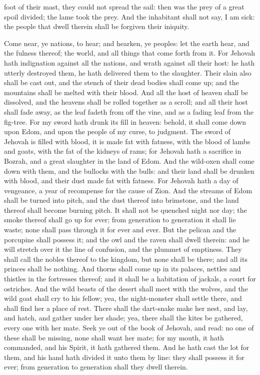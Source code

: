 foot of their mast, they could not spread the sail: then was the prey of a great spoil divided; the lame took the prey. And the inhabitant shall not say, I am sick: the people that dwell therein shall be forgiven their iniquity. 

Come near, ye nations, to hear; and hearken, ye peoples: let the earth hear, and the fulness thereof; the world, and all things that come forth from it. For Jehovah hath indignation against all the nations, and wrath against all their host: he hath utterly destroyed them, he hath delivered them to the slaughter. Their slain also shall be cast out, and the stench of their dead bodies shall come up; and the mountains shall be melted with their blood. And all the host of heaven shall be dissolved, and the heavens shall be rolled together as a scroll; and all their host shall fade away, as the leaf fadeth from off the vine, and as a fading leaf from the fig-tree. For my sword hath drunk its fill in heaven: behold, it shall come down upon Edom, and upon the people of my curse, to judgment. The sword of Jehovah is filled with blood, it is made fat with fatness, with the blood of lambs and goats, with the fat of the kidneys of rams; for Jehovah hath a sacrifice in Bozrah, and a great slaughter in the land of Edom. And the wild-oxen shall come down with them, and the bullocks with the bulls: and their land shall be drunken with blood, and their dust made fat with fatness.  For Jehovah hath a day of vengeance, a year of recompense for the cause of Zion. And the streams of Edom shall be turned into pitch, and the dust thereof into brimstone, and the land thereof shall become burning pitch. It shall not be quenched night nor day; the smoke thereof shall go up for ever; from generation to generation it shall lie waste; none shall pass through it for ever and ever. But the pelican and the porcupine shall possess it; and the owl and the raven shall dwell therein: and he will stretch over it the line of confusion, and the plummet of emptiness. They shall call the nobles thereof to the kingdom, but none shall be there; and all its princes shall be nothing. And thorns shall come up in its palaces, nettles and thistles in the fortresses thereof; and it shall be a habitation of jackals, a court for ostriches. And the wild beasts of the desert shall meet with the wolves, and the wild goat shall cry to his fellow; yea, the night-monster shall settle there, and shall find her a place of rest. There shall the dart-snake make her nest, and lay, and hatch, and gather under her shade; yea, there shall the kites be gathered, every one with her mate.  Seek ye out of the book of Jehovah, and read: no one of these shall be missing, none shall want her mate; for my mouth, it hath commanded, and his Spirit, it hath gathered them. And he hath cast the lot for them, and his hand hath divided it unto them by line: they shall possess it for ever; from generation to generation shall they dwell therein. 

